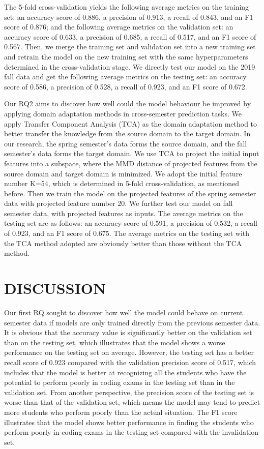 \documentclass[sigconf,final]{acmart}
\begin{document}
The 5-fold cross-validation yields the following average metrics on the training set: an accuracy score of 0.886, a precision of 0.913, a recall of 0.843, and an F1 score of 0.876; and the following average metrics on the validation set: an accuracy score of 0.633, a precision of 0.685, a recall of 0.517, and an F1 score of 0.567. Then, we merge the training set and validation set into a new training set and retrain the model on the new training set with the same hyperparameters determined in the cross-validation stage. We directly test our model on the 2019 fall data and get the following average metrics on the testing set: an accuracy score of 0.586, a precision of 0.528, a recall of 0.923, and an F1 score of 0.672. 

Our RQ2 aims to discover how well could the model behaviour be improved by applying domain adaptation methods in cross-semester prediction tasks. We apply Transfer Component Analysis (TCA) as the domain adaptation method to better transfer the knowledge from the source domain to the target domain. In our research, the spring semester’s data forms the source domain, and the fall semester’s data forms the target domain. We use TCA to project the initial input features into a subspace, where the MMD distance of projected features from the source domain and target domain is minimized. We adopt the initial feature number K=54, which is determined in 5-fold cross-validation, as mentioned before. Then we train the model on the projected features of the spring semester data with projected feature number 20. We further test our model on fall semester data, with projected features as inputs. The average metrics on the testing set are as follows: an accuracy score of 0.591, a precision of 0.532, a recall of 0.923, and an F1 score of 0.675. The average metrics on the testing set with the TCA method adopted are obviously better than those without the TCA method.

\section{DISCUSSION}
Our first RQ sought to discover how well the model could behave on current semester data if models are only trained directly from the previous semester data. It is obvious that the accuracy value is significantly better on the validation set than on the testing set, which illustrates that the model shows a worse performance on the testing set on average. However, the testing set has a better recall score of 0.923 compared with the validation precision score of 0.517, which includes that the model is better at recognizing all the students who have the potential to perform poorly in coding exams in the testing set than in the validation set. From another perspective, the precision score of the testing set is worse than that of the validation set, which means the model may tend to predict more students who perform poorly than the actual situation. The F1 score illustrates that the model shows better performance in finding the students who perform poorly in coding exams in the testing set compared with the invalidation set. 
\end{document}
